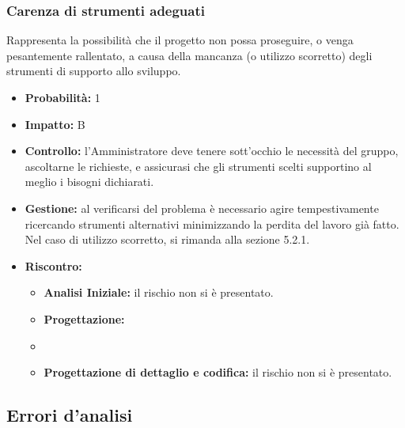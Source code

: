 \documentclass[a4paper,11pt]{article}
\begin{document}
		\subsubsection{Carenza di strumenti adeguati}
		Rappresenta la possibilità che il progetto non possa proseguire, o venga pesantemente rallentato, a causa della mancanza (o utilizzo scorretto) degli strumenti di supporto allo sviluppo.
		\begin{itemize}
		\item \textbf{Probabilità: }1
		\item \textbf{Impatto: }B
		\item \textbf{Controllo:} l'Amministratore deve tenere sott'occhio le necessità  del gruppo, ascoltarne le richieste, e assicurasi che gli strumenti scelti supportino al meglio i bisogni dichiarati.
		\item \textbf{Gestione:} al verificarsi del problema è necessario agire tempestivamente ricercando strumenti alternativi minimizzando la perdita del lavoro già fatto. Nel caso di utilizzo scorretto, si rimanda alla sezione 5.2.1.
		\item \textbf{Riscontro:}
			\begin{itemize}
				\item\textbf{Analisi Iniziale:} il rischio non si è presentato.
				\item\textbf{Progettazione:} %
				\item\item\textbf{Progettazione di dettaglio e codifica:} il rischio non si è presentato.
			\end{itemize}
		\end{itemize}
	\subsection{Errori d'analisi} \label{risk: errori}
\end{document}
